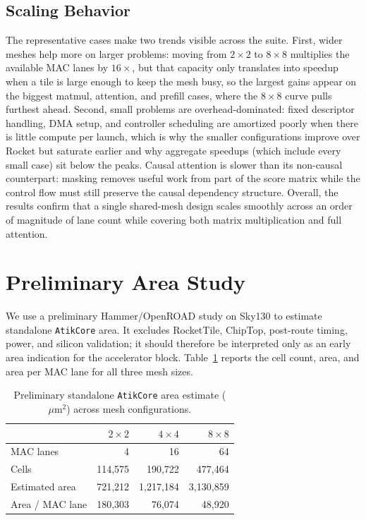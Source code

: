 \documentclass[sigconf,nonacm]{acmart}
\begin{document}
\subsection{Scaling Behavior}
The representative cases make two trends visible across the suite. First, wider meshes help more on larger
problems: moving from $2\times2$ to $8\times8$ multiplies the available MAC lanes
by $16\times$, but that capacity only translates into speedup when a tile is
large enough to keep the mesh busy, so the largest gains appear on the biggest
matmul, attention, and prefill cases, where the $8\times8$ curve pulls furthest
ahead. Second, small problems are overhead-dominated: fixed descriptor handling,
DMA setup, and controller scheduling are amortized poorly when there is little
compute per launch, which is why the smaller configurations improve over Rocket
but saturate earlier and why aggregate speedups (which include every small case)
sit below the peaks. Causal attention is slower than its non-causal counterpart:
masking removes useful work from part of the score matrix while the control flow
must still preserve the causal dependency structure. Overall, the results confirm that a single shared-mesh design scales
smoothly across an order of magnitude of lane count while covering both matrix
multiplication and full attention.

\section{Preliminary Area Study}
\label{sec:vlsi}

We use a preliminary Hammer/OpenROAD study on Sky130 to estimate standalone
\texttt{AtikCore} area. It excludes RocketTile, ChipTop, post-route timing,
power, and silicon validation; it should therefore be interpreted only as an
early area indication for the accelerator block.
Table~\ref{tab:vlsi-overview} reports the cell count, area, and area per MAC
lane for all three mesh sizes.

\begin{table}[H]
  \centering
  \caption{Preliminary standalone \texttt{AtikCore} area estimate
    ($\mu\mathrm{m}^2$) across mesh configurations.}
  \label{tab:vlsi-overview}
  \begin{tabular}{lrrr}
    \toprule
    & $2\times2$ & $4\times4$ & $8\times8$ \\
    \midrule
    MAC lanes            & 4       & 16        & 64 \\
    Cells                & 114{,}575 & 190{,}722 & 477{,}464 \\
    Estimated area       & 721{,}212 & 1{,}217{,}184 & 3{,}130{,}859 \\
    Area / MAC lane      & 180{,}303 & 76{,}074  & 48{,}920 \\
    \bottomrule
  \end{tabular}
\end{table}
\end{document}
